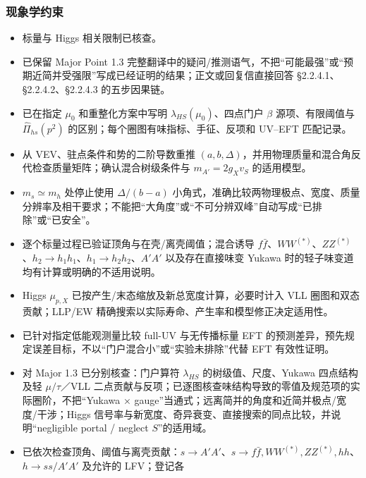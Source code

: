 \documentclass[
  chinese,
  UTF8]{ctexart}
\providecommand{\tightlist}{%
  \setlength{\itemsep}{0pt}\setlength{\parskip}{0pt}}
\begin{document}
\subsubsection{现象学约束}\label{ux73b0ux8c61ux5b66ux7ea6ux675f}

\begin{itemize}
\tightlist
\item[$\square$]
  标量与 Higgs 相关限制已核查。
\item[$\square$]
  已保留 Major Point 1.3
  完整翻译中的疑问/推测语气，不把``可能最强''或``预期近简并受强限''写成已经证明的结果；正文或回复信直接回答
  §2.2.4.1、§2.2.4.2、§2.2.4.3 的五步因果链。
\item[$\square$]
  已在指定 \(\mu_0\) 和重整化方案中写明
  \(\lambda_{HS}(\mu_0)\)、四点门户 \(\beta\) 源项、有限阈值与
  \(\widehat\Pi_{hs}(p^2)\) 的区别；每个圈图有味指标、手征、反项和
  UV--EFT 匹配记录。
\item[$\square$]
  从 VEV、驻点条件和势的二阶导数重推
  \((a,b,\Delta)\)，并用物理质量和混合角反代检查质量矩阵；确认混合树级条件与
  \(m_{A'}=2g_Xv_S\) 的适用模型。
\item[$\square$]
  \(m_s\simeq m_h\) 处停止使用 \(\Delta/(b-a)\)
  小角式，准确比较两物理极点、宽度、质量分辨率及相干要求；不能把``大角度''或``不可分辨双峰''自动写成``已排除''或``已安全''。
\item[$\square$]
  逐个标量过程已验证顶角与在壳/离壳阈值；混合诱导
  \(f\bar f\)、\(WW^{(*)}\)、\(ZZ^{(*)}\)、\(h_2\to h_1h_1\)、\(h_1\to h_2h_2\)、\(A'A'\)
  以及存在直接味变 Yukawa 时的轻子味变道均有计算或明确的不适用说明。
\item[$\square$]
  Higgs \(\mu_{p,X}\) 已按产生/末态缩放及新总宽度计算，必要时计入 VLL
  圈图和双态贡献；LLP/EW
  精确搜索以实际寿命、产生率和模型修正决定适用性。
\item[$\square$]
  已针对指定低能观测量比较 full-UV 与无传播标量 EFT
  的预测差异，预先规定误差目标，不以``门户混合小''或``实验未排除''代替
  EFT 有效性证明。
\item[$\square$]
  对 Major 1.3 已分别核查：门户算符 \(\lambda_{HS}\)
  的树级值、尺度、Yukawa 四点结构及轻 \(\mu/\tau\)／VLL
  二点贡献与反项；已逐图核查味结构导致的零值及规范项的实际圈阶，不把``Yukawa
  × gauge''当通式；远离简并的角度和近简并极点/宽度/干涉；Higgs
  信号率与新宽度、奇异衰变、直接搜索的同点比较，并说明``negligible
  portal / neglect \(S\)''的适用域。
\item[$\square$]
  已依次检查顶角、阈值与离壳贡献：\(s\to A'A'\)、\(s\to f\bar f,WW^{(*)},ZZ^{(*)},hh\)、\(h\to ss/A'A'\)
  及允许的 LFV；登记各

\end{itemize}
\end{document}
